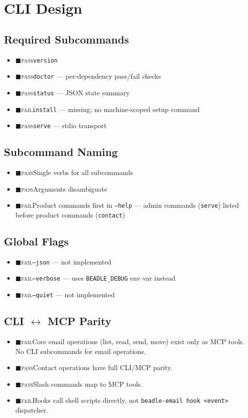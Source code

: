 \documentclass[a4paper,10pt]{article}
\newcommand{\pass}{{\color{green!60!black}$\blacksquare$\hspace{0.4em}\textsc{pass}}\hspace{0.5em}}
\newcommand{\fail}{{\color{red!70!black}$\blacksquare$\hspace{0.4em}\textsc{fail}}\hspace{0.5em}}
\begin{document}
% 
\section{CLI Design}

\subsection{Required Subcommands}
\begin{itemize}
  \item \pass \texttt{version}
  \item \pass \texttt{doctor} --- per-dependency pass/fail checks
  \item \pass \texttt{status} --- JSON state summary
  \item \fail \texttt{install} --- missing; no machine-scoped setup command
  \item \pass \texttt{serve} --- stdio transport
\end{itemize}

\subsection{Subcommand Naming}
\begin{itemize}
  \item \pass Single verbs for all subcommands
  \item \pass Arguments disambiguate
  \item \fail Product commands first in \texttt{--help} --- admin commands
    (\texttt{serve}) listed before product commands (\texttt{contact})
\end{itemize}

\subsection{Global Flags}
\begin{itemize}
  \item \fail \texttt{--json} --- not implemented
  \item \fail \texttt{--verbose} --- uses \texttt{BEADLE\_DEBUG} env var instead
  \item \fail \texttt{--quiet} --- not implemented
\end{itemize}

\subsection{CLI $\leftrightarrow$ MCP Parity}
\begin{itemize}
  \item \fail Core email operations (list, read, send, move) exist only as
    MCP tools. No CLI subcommands for email operations.
  \item \pass Contact operations have full CLI/MCP parity.
  \item \pass Slash commands map to MCP tools.
  \item \fail Hooks call shell scripts directly, not
    \texttt{beadle-email hook <event>} dispatcher.
\end{itemize}
\end{document}
